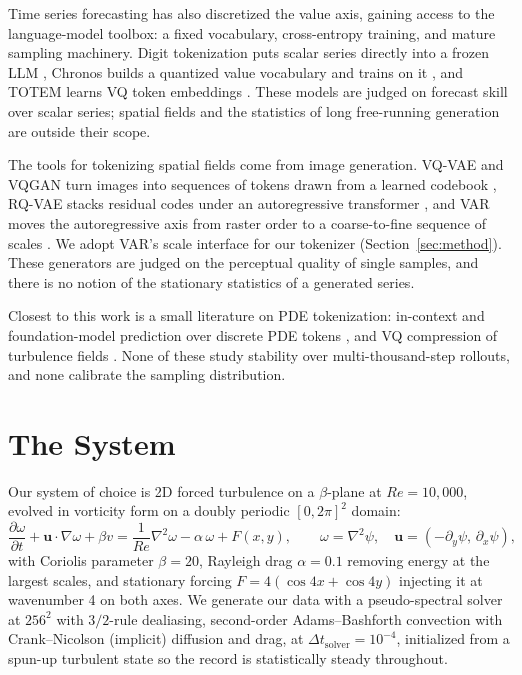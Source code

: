 \documentclass{article}
\begin{document}
Time series forecasting has also discretized the value axis, gaining access to the
language-model toolbox: a fixed vocabulary, cross-entropy training, and mature sampling
machinery. Digit tokenization puts scalar series directly into a frozen LLM
\citep{gruver2023llmtime}, Chronos builds a quantized value vocabulary and trains on it
\citep{ansari2024chronos}, and TOTEM learns VQ token embeddings \citep{talukder2024totem}.
These models are judged on forecast skill over scalar series; spatial fields and the
statistics of long free-running generation are outside their scope.

The tools for tokenizing spatial fields come from image generation. VQ-VAE and VQGAN turn
images into sequences of tokens drawn from a learned codebook
\citep{oord2017neural,esser2021taming}, RQ-VAE stacks residual codes under an
autoregressive transformer \citep{lee2022rqvae}, and VAR moves the autoregressive axis
from raster order to a coarse-to-fine sequence of scales \citep{tian2024var}. We adopt
VAR's scale interface for our tokenizer (Section~\ref{sec:method}). These generators are
judged on the perceptual quality of single samples, and there is no notion of the
stationary statistics of a generated series.

Closest to this work is a small literature on PDE tokenization: in-context and
foundation-model prediction over discrete PDE tokens \citep{serrano2024zebra,
nguyen2025physix}, and VQ compression of turbulence fields \citep{momenifar2021dimension}.
None of these study stability over multi-thousand-step rollouts, and none calibrate the
sampling distribution.

\section{The System}
\label{sec:contlineage}
\label{sec:contchallenge}
\label{sec:system}

Our system of choice is 2D forced turbulence on a $\beta$-plane at $Re = 10{,}000$, evolved in
vorticity form on a doubly periodic $[0, 2\pi]^2$ domain:
      \[
      \frac{\partial \omega}{\partial t} + \mathbf{u} \cdot \nabla \omega + \beta v
        = \frac{1}{Re} \nabla^2 \omega - \alpha\,\omega + F(x, y),
      \qquad
      \omega = \nabla^2 \psi, \quad \mathbf{u} = (-\partial_y \psi,\, \partial_x \psi),
      \]
      with Coriolis parameter $\beta = 20$, Rayleigh drag $\alpha = 0.1$ removing energy at
      the largest scales, and stationary forcing $F = 4(\cos 4x + \cos 4y)$ injecting it at
      wavenumber 4 on both axes.
 We generate our data with a pseudo-spectral solver at $256^2$ with $3/2$-rule dealiasing,
 second-order Adams--Bashforth convection with Crank--Nicolson (implicit) diffusion and drag, at $\Delta t_{\mathrm{solver}} = 10^{-4}$, initialized from a spun-up
 turbulent state so the record is statistically steady throughout. 
      
\end{document}
